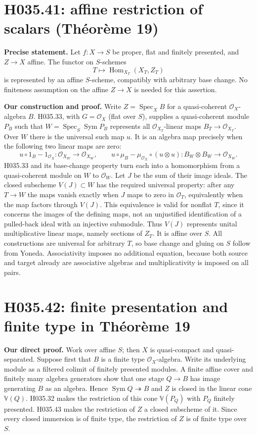 \section{H035.41: affine restriction of scalars (Théorème 19)}
\textbf{Precise statement.} Let $f:X\to S$ be proper, flat and
finitely presented, and $Z\to X$ affine. The functor on $S$-schemes
\[
 T\longmapsto\operatorname{Hom}_{X_T}(X_T,Z_T)
\]
is represented by an affine $S$-scheme, compatibly with arbitrary
base change. No finiteness assumption on the affine $Z\to X$
is needed for this assertion.

\textbf{Our construction and proof.} Write $Z=\operatorname{Spec}_X B$
for a quasi-coherent $\mathcal O_X$-algebra $B$. H035.33, with
$G=\mathcal O_X$ (flat over $S$), supplies a quasi-coherent module
$P_B$ such that $W=\operatorname{Spec}_S\operatorname{Sym}P_B$
represents all $\mathcal O_{X_T}$-linear maps $B_T\to\mathcal O_{X_T}$.
Over $W$ there is the universal such map $u$. It is an algebra map
precisely when the following two linear maps are zero:
\[
 u\circ 1_B-1_{\mathcal O_X}:\mathcal O_{X_W}\to\mathcal O_{X_W},
 \qquad
 u\circ\mu_B-\mu_{\mathcal O_X}\circ(u\otimes u):
 B_W\otimes B_W\to\mathcal O_{X_W}.
\]
H035.33 and its base-change property turn each into a homomorphism
from a quasi-coherent module on $W$ to $\mathcal O_W$. Let $J$
be the sum of their image ideals. The closed subscheme $V(J)\subset W$
has the required universal property: after any $T\to W$ the maps
vanish exactly when $J$ maps to zero in $\mathcal O_T$, equivalently
when the map factors through $V(J)$. This equivalence is valid for
nonflat $T$, since it concerns the images of the defining maps,
not an unjustified identification of a pulled-back ideal with an
injective submodule. Thus $V(J)$ represents unital multiplicative
linear maps, namely sections of $Z_T$. It is affine over $S$.
All constructions are universal for arbitrary $T$, so base change
and gluing on $S$ follow from Yoneda. Associativity imposes no
additional equation, because both source and target already are
associative algebras and multiplicativity is imposed on all pairs.

\section{H035.42: finite presentation and finite type in Théorème 19}
\textbf{Our direct proof.} Work over affine $S$; then $X$ is
quasi-compact and quasi-separated. Suppose first that $B$ is a
finite type $\mathcal O_X$-algebra. Write its underlying module
as a filtered colimit of finitely presented modules. A finite
affine cover and finitely many algebra generators show that one
stage $Q\to B$ has image generating $B$ as an algebra. Hence
$\operatorname{Sym}Q\twoheadrightarrow B$ and $Z$ is closed
in the linear cone $\mathbb V(Q)$. H035.32 makes the restriction
of this cone $\mathbb V(P_Q)$ with $P_Q$ finitely presented.
H035.43 makes the restriction of $Z$ a closed subscheme of it.
Since every closed immersion is of finite type, the restriction
of $Z$ is of finite type over $S$.


